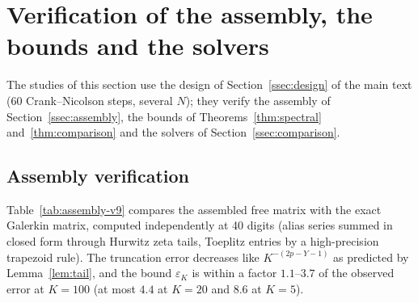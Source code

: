 \documentclass[supplement,hidelinks]{siamart251216}
\begin{document}
\FloatBarrier
\section{Verification of the assembly, the bounds and the solvers}
\label{sm:verification}
The studies of this section use the design of Section~\ref{ssec:design} of the main text (60 Crank--Nicolson
steps, several $N$); they verify the assembly of Section~\ref{ssec:assembly}, the bounds of
Theorems~\ref{thm:spectral} and~\ref{thm:comparison} and the solvers of Section~\ref{ssec:comparison}.
\subsection{Assembly verification}
Table~\ref{tab:assembly-v9} compares the assembled free matrix with the exact Galerkin matrix,
computed independently at 40 digits (alias series summed in closed form through Hurwitz zeta
tails, Toeplitz entries by a high-precision trapezoid rule).  The truncation error decreases
like $K^{-(2p-Y-1)}$ as predicted by Lemma~\ref{lem:tail}, and the bound $\varepsilon_K$ is
within a factor $1.1$--$3.7$ of the observed error at $K=100$ (at most $4.4$ at $K=20$ and $8.6$ at $K=5$).

\end{document}
